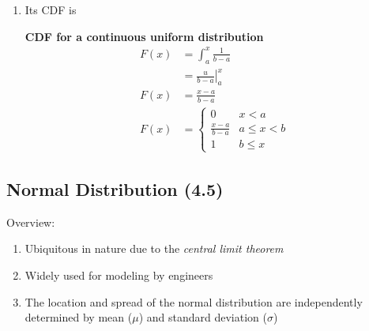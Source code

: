 \documentclass[../INDE315.tex]{subfiles}
\begin{document}
\begin{enumerate}
    \item Its CDF is
        \begin{defn}
            \textbf{CDF for a continuous uniform distribution} \\
            \begin{equation*}
                \begin{aligned}
                    F(x) &= \int ^x _a \frac{1}{b-a} \\
                        &= \left. \frac{u}{b-a} \right| ^x _a \\
                    F(x) &= \frac{x-a}{b-a} \\
                    F(x) &= 
                        \begin{cases}
                            0 & x < a \\
                            \frac{x-a}{b-a} & a \leq x < b \\
                            1 & b \leq x
                        \end{cases}
                \end{aligned}
            \end{equation*}
        \end{defn}
\end{enumerate}

\subsection*{Normal Distribution (4.5)}
Overview:
\begin{enumerate}
    \item Ubiquitous in nature due to the \emph{central limit theorem}
    \item Widely used for modeling by engineers
    \item The location and spread of the normal distribution are independently determined by mean ($\mu$) and standard deviation ($\sigma$)
\end{enumerate}
\end{document}
